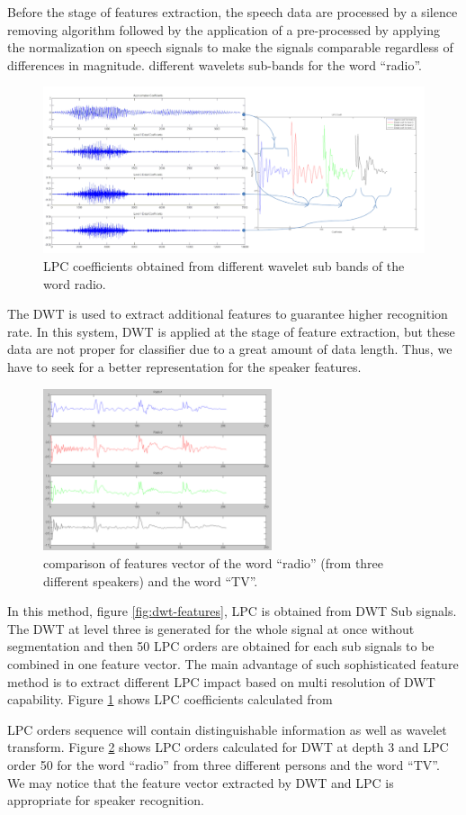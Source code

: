 \documentclass[12pt, a4paper, twoside]{report}
\begin{document}
Before the stage of features extraction, the speech data are processed by a silence removing algorithm followed by the application of a pre-processed by applying the normalization on speech signals to make the signals comparable regardless of differences in magnitude.
different wavelets sub-bands for the word “radio”.
\begin{figure}[!h]
	\centering
	\includegraphics[width=1\textwidth]
	{images/chapter5/dwt-radio}
	\caption{LPC coefficients obtained from different wavelet sub bands of the word radio.}
	\label{fig:dwt-radio}
\end{figure}

The DWT is used to extract additional features to guarantee higher recognition rate. In this system, DWT is applied at the stage of feature extraction, but these data are not proper for classifier due to a great amount of data length. Thus, we have to seek for a better representation for the speaker features.
\begin{figure}[!h]
	\centering
	\includegraphics[width=0.6\textwidth]
	{images/chapter5/dwt-lpc-orders}
	\caption{comparison of features vector of the word ``radio'' (from three different speakers) and the word ``TV''.}
	\label{fig:dwt-lpc-orders}
\end{figure}

In this method, figure \ref{fig:dwt-features}, LPC is obtained from DWT Sub signals. The DWT at level three is generated for the whole signal at once without segmentation and then 50 LPC orders are obtained for each sub signals to be combined in one feature vector. The main advantage of such sophisticated feature method is to extract different LPC impact based on multi resolution of DWT capability. Figure \ref{fig:dwt-radio} shows LPC coefficients calculated from 
\par
LPC orders sequence will contain distinguishable information as well as wavelet transform. Figure \ref{fig:dwt-lpc-orders} shows LPC orders calculated for DWT at depth 3 and LPC order 50 for the word ``radio'' from three different persons and the word ``TV''. We may notice that the feature vector extracted by DWT and LPC is appropriate for speaker recognition.
\end{document}
